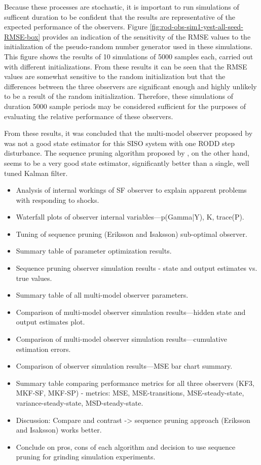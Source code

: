 Because these processes are stochastic, it is important to run simulations of sufficent duration to be confident that the results are representative of the expected performance of the observers. Figure \ref{fig:rod-obs-sim1-yest-all-seed-RMSE-box} provides an indication of the sensitivity of the RMSE values to the initialization of the pseudo-random number generator used in these simulations. This figure shows the results of 10 simulations of 5000 samples each, carried out with different initializations. From these results it can be seen that the RMSE values are somewhat sensitive to the random initialization but that the differences between the three observers are significant enough and highly unlikely to be a result of the random initialization. Therefore, these simulations of duration 5000 sample periods may be considered sufficient for the purposes of evaluating the relative performance of these observers.

From these results, it was concluded that the multi-model observer proposed by \cite{robertson_method_1998} was not a good state estimator for this SISO system with one RODD step disturbance. The sequence pruning algorithm proposed by \cite{eriksson_classification_1996}, on the other hand, seems to be a very good state estimator, significantly better than a single, well tuned Kalman filter.


\begin{itemize}
	\item Analysis of internal workings of SF observer to explain apparent problems with responding to shocks.
	\item Waterfall plots of observer internal variables—p(Gamma|Y), K, trace(P).
	\item Tuning of sequence pruning (Eriksson and Isaksson) sub-optimal observer.
	\item Summary table of parameter optimization results.
	\item Sequence pruning observer simulation results - state and output estimates vs. true values.
	\item Summary table of all multi-model observer parameters.
	\item Comparison of multi-model observer simulation results—hidden state and output estimates plot.
	\item Comparison of multi-model observer simulation results—cumulative estimation errors.
	\item Comparison of observer simulation results—MSE bar chart summary.
	\item Summary table comparing performance metrics for all three observers (KF3, MKF-SF, MKF-SP) - metrics: MSE, MSE-transitions, MSE-steady-state, variance-steady-state, MSD-steady-state.
	\item Discussion: Compare and contrast -> sequence pruning approach (Eriksson and Isaksson) works better.
	\item Conclude on pros, cons of each algorithm and decision to use sequence pruning for grinding simulation experiments.
\end{itemize}

